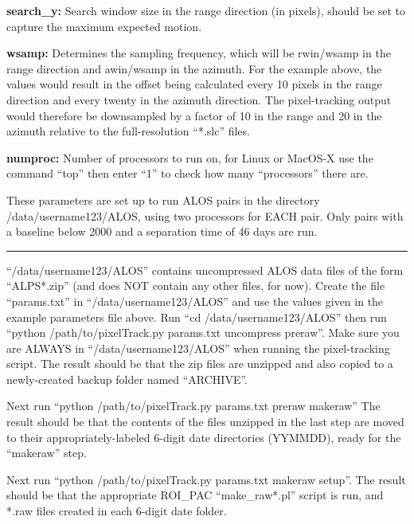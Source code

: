 \documentclass[12pt]{article}
\begin{document}
{\bf search\_y:} Search window size in the range direction (in pixels), should be set to capture the maximum expected motion.

{\bf wsamp:} Determines the sampling frequency, which will be rwin/wsamp in the range direction and awin/wsamp in the azimuth.
For the example above, the values would result in the offset being calculated every 10 pixels in the range direction and every twenty in the azimuth direction.
The pixel-tracking output would therefore be downsampled by a factor of 10 in the range and 20 in the azimuth relative to the full-resolution ``*.slc'' files.

{\bf numproc:} Number of processors to run on, for Linux or MacOS-X use the command ``top'' then enter ``1'' to check how many ``processors'' there are. \\


These parameters are set up to run ALOS pairs in the directory /data/username123/ALOS, using two processors for EACH pair.
Only pairs with a baseline below 2000 and a separation time of 46 days are run. \\


\vspace{1pt}
\hrule
\vspace{2pt}


``/data/username123/ALOS'' contains uncompressed ALOS data files of the form ``ALPS*.zip'' (and does NOT contain any other files, for now).
Create the file ``params.txt'' in ``/data/username123/ALOS'' and use the values given in the example parameters file above.
Run ``cd /data/username123/ALOS'' then run ``python /path/to/pixelTrack.py params.txt uncompress preraw''.
Make sure you are ALWAYS in ``/data/username123/ALOS'' when running the pixel-tracking script.
The result should be that the zip files are unzipped and also copied to a newly-created backup folder named ``ARCHIVE''.

Next run ``python /path/to/pixelTrack.py params.txt preraw makeraw''
The result should be that the contents of the files unzipped in the last step are moved to their appropriately-labeled 6-digit date directories (YYMMDD), ready for the ``makeraw'' step.

Next run ``python /path/to/pixelTrack.py params.txt makeraw setup''.
The result should be that the appropriate ROI\_PAC ``make\_raw*.pl'' script is run, and *.raw files created in each 6-digit date folder.
\end{document}
